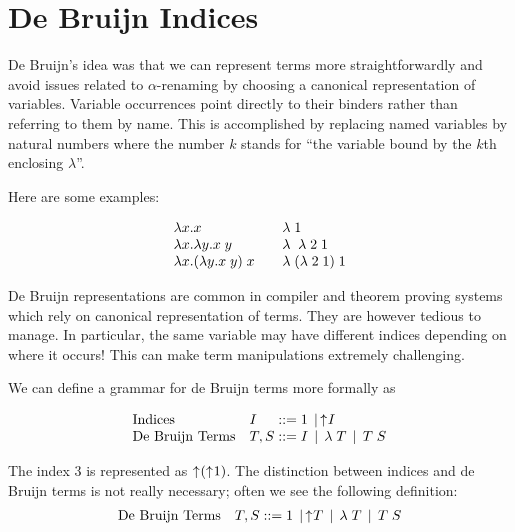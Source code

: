 

\section{De Bruijn Indices}\label{sec:debruijn}

De Bruijn's idea was that we can represent terms more
straightforwardly and avoid issues related to $\alpha$-renaming by
choosing a canonical representation of variables. Variable occurrences
point directly to their binders rather than referring to them by
name. This is accomplished by replacing named variables by natural
numbers where the number $k$ stands for ``the variable bound by the
$k$th enclosing $\lambda$''.

Here are some examples:

\[
\begin{array}{l@{\qquad}l}
\lam x. x  & \lamdb 1 \\
\lam x. \lam y . x\;y & \lamdb\; \lamdb 2\; 1\\
\lam x. (\lam y. x \; y)\; x & \lamdb (\lamdb 2\;1) \;1
\end{array}
\]

De Bruijn representations are common in compiler and theorem proving
systems which rely on canonical representation of terms. They are
however tedious to manage. In particular, the same variable may have
different indices depending on where it occurs! This can make term
manipulations extremely challenging.

We can define a grammar for de Bruijn terms more formally as

\[
\begin{array}{ll@{\bnfas}l}
\mbox{Indices}         & I    & 1 \bnfalt \shift I \\
\mbox{De Bruijn Terms} & T, S & I \bnfalt \lamdb T \bnfalt T \app S
\end{array}
\]

The index $3$ is represented as $\shift (\shift 1)$. The distinction
between indices and de Bruijn terms is not really necessary; often we
see the following definition:
\[
\begin{array}{ll@{\bnfas}l}
\mbox{De Bruijn Terms} & T, S & 1 \bnfalt \shift T \bnfalt \lamdb T \bnfalt T \app S
\end{array}
\]

